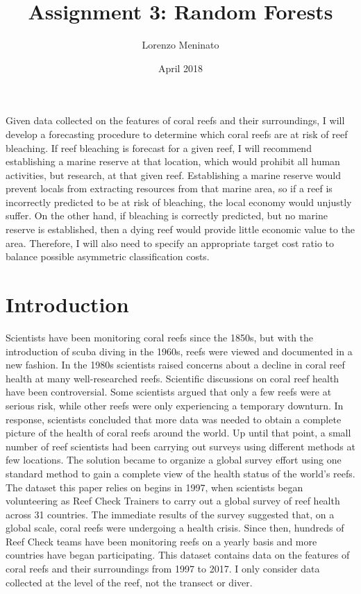 \documentclass{article}
\title{Assignment 3: Random Forests}
\author{Lorenzo Meninato}
\date{April 2018}
\begin{document}
\maketitle

Given data collected on the features of coral reefs and their surroundings, I will develop a forecasting procedure to determine which coral reefs are at risk of reef bleaching. If reef bleaching is forecast for a given reef, I will recommend establishing a marine reserve at that location, which would prohibit all human activities, but research, at that given reef. Establishing a marine reserve would prevent locals from extracting resources from that marine area, so if a reef is incorrectly predicted to be at risk of bleaching, the local economy would unjustly suffer. On the other hand, if bleaching is correctly predicted, but no marine reserve is established, then a dying reef would provide little economic value to the area. Therefore, I will also need to specify an appropriate target cost ratio to balance possible asymmetric classification costs.

\section{Introduction}
Scientists have been monitoring coral reefs since the 1850s, but with the introduction of scuba diving in the 1960s, reefs were viewed and documented in a new fashion. In the 1980s scientists raised concerns about a decline in coral reef health at many well-researched reefs. Scientific discussions on coral reef health have been controversial. Some scientists argued that only a few reefs were at serious risk, while other reefs were only experiencing a temporary downturn. In response, scientists concluded that more data was needed to obtain a complete picture of the health of coral reefs around the world. Up until that point, a small number of reef scientists had been carrying out surveys using different methods at few locations. The solution became to organize a global survey effort using one standard method to gain a complete view of the health status of the world's reefs. The dataset this paper relies on begins in 1997, when scientists began volunteering as Reef Check Trainers to carry out a global survey of reef health across 31 countries. The immediate results of the survey suggested that, on a global scale, coral reefs were undergoing a health crisis. Since then, hundreds of Reef Check teams have been monitoring reefs on a yearly basis and more countries have began participating. This dataset contains data on the features of coral reefs and their surroundings from 1997 to 2017. I only consider data collected at the level of the reef, not the transect or diver. 
\end{document}
